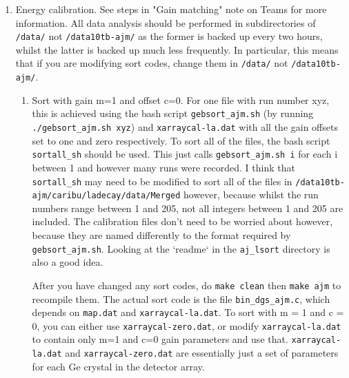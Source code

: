 \documentclass{article}
\begin{document}
\begin{enumerate}
\item Energy calibration. See steps in "Gain matching" note on Teams for more information. All data analysis should be performed in subdirectories of \verb#/data/# not \verb#/data10tb-ajm/# as the former is backed up every two hours, whilst the latter is backed up much less frequently. In particular, this means that if you are modifying sort codes, change them in \verb#/data/# not \verb#/data10tb-ajm/#. 
\begin{enumerate}
\item Sort with gain m=1 and offset c=0. 
For one file with run number xyz, this is achieved using the bash script \verb#gebsort_ajm.sh# (by running \verb#./gebsort_ajm.sh xyz#) and \verb#xarraycal-la.dat# with all the gain offsets set to one and zero respectively.
To sort all of the files, the bash script \verb#sortall_sh# should be used.
This just calls \verb#gebsort_ajm.sh i# for each i between 1 and however many runs were recorded.
I think that \verb#sortall_sh# may need to be modified to sort all of the files in \verb#/data10tb-ajm/caribu/ladecay/data/Merged# however, because whilst the run numbers range between 1 and 205, not all integers between 1 and 205 are included.
The calibration files don't need to be worried about however, because they are named differently to the format required by \verb#gebsort_ajm.sh#.
Looking at the `readme` in the \verb#aj_lsort# directory is also a good idea. 

\medskip
\noindent
After you have changed any sort codes, do \verb#make clean# then \verb#make ajm# to recompile them. The actual sort code is the file \verb#bin_dgs_ajm.c#, which depends on \verb#map.dat# and \verb#xarraycal-la.dat#. To sort with m = 1 and c = 0, you can either use \verb#xarraycal-zero.dat#, or modify \verb#xarraycal-la.dat# to contain only m=1 and c=0 gain parameters and use that.
\verb#xarraycal-la.dat# and \verb#xarraycal-zero.dat# are essentially just a set of parameters for each Ge crystal in the detector array.


\end{enumerate}
\end{enumerate}
\end{document}
